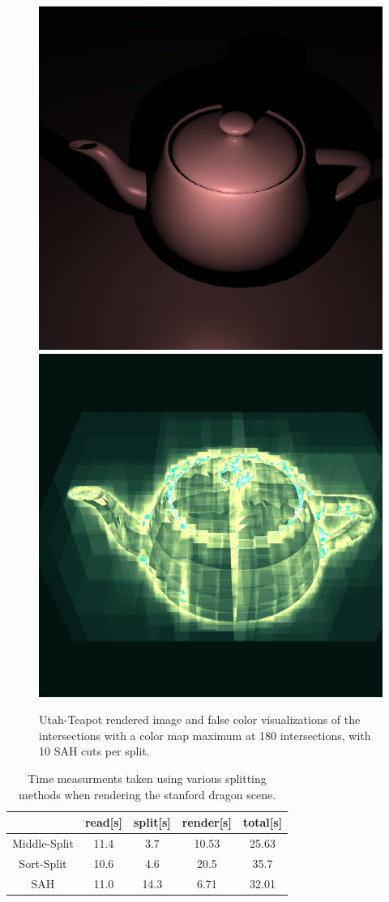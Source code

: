 \begin{figure}
\centering
\includegraphics[width=0.45\linewidth]{./img/teapot}
\includegraphics[width=0.45\linewidth]{./img/teaFCGreen10}
\caption{Utah-Teapot rendered image and false color visualizations of the intersections with a color map maximum at 180 intersections, with 10 SAH cuts per split.}
\label{fig:teapotWithAcc}
\end{figure}

\begin{table}
\centering
\begin{tabular}{|c|c|c|c|c|} \hline
				& read[s] & split[s] & render[s] & total[s] \\ \hline
Middle-Split    & 11.4 & 3.7   &  10.53  & 25.63 \\
Sort-Split      & 10.6 & 4.6   &  20.5  & 35.7	 \\
SAH             & 11.0 & 14.3  &  6.71  & 32.01	 \\ \hline
\end{tabular}
\caption{Time measurments taken using various splitting methods when rendering the stanford dragon scene.}
\label{tab:DragonTiming}
\end{table}


